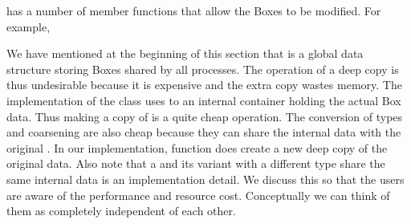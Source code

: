 \documentclass[letterpaper,10pt,english]{sphinxmanual}
\begin{document}
\begin{sphinxVerbatim}[commandchars=\\\{\}]
\PYG{p}{[}\PYG{p}{]}  
\end{sphinxVerbatim}

\sphinxAtStartPar
{} has a number of member functions that allow the Boxes to be
modified. For example,

\begin{sphinxVerbatim}[commandchars=\\\{\}]
      
    
     
    
\end{sphinxVerbatim}

\sphinxAtStartPar
We have mentioned at the beginning of this section that  is a
global data structure storing Boxes shared by all processes.  The operation of
a deep copy is thus undesirable because it is expensive and the extra copy
wastes memory. The implementation of the  class uses
 to an internal container holding the actual Box data.
Thus making a copy of  is a quite cheap operation. The
conversion of types and coarsening are also cheap because they can share the
internal data with the original . In our implementation,
function  does create a new deep copy of the original data. Also
note that a  and its variant with a different type share the
same internal data is an implementation detail.  We discuss this so that the
users are aware of the performance and resource cost. Conceptually we can think
of them as completely independent of each other.
\end{document}
